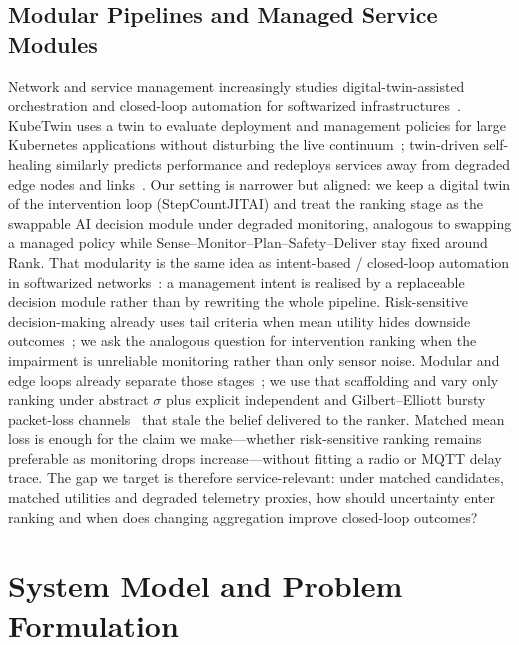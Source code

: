 \documentclass[journal]{IEEEtran}
\begin{document}
\subsection{Modular Pipelines and Managed Service Modules}
Network and service management increasingly studies digital-twin-assisted orchestration and closed-loop automation for softwarized infrastructures~\cite{borsatti2024kubetwin,wang2023dtservice}.
KubeTwin uses a twin to evaluate deployment and management policies for large Kubernetes applications without disturbing the live continuum~\cite{borsatti2024kubetwin}; twin-driven self-healing similarly predicts performance and redeploys services away from degraded edge nodes and links~\cite{wang2023dtservice}.
Our setting is narrower but aligned: we keep a digital twin of the intervention loop (StepCountJITAI) and treat the ranking stage as the swappable AI decision module under degraded monitoring, analogous to swapping a managed policy while Sense--Monitor--Plan--Safety--Deliver stay fixed around Rank.
That modularity is the same idea as intent-based / closed-loop automation in softwarized networks~\cite{clemm2022ibn,boutaba2018mlnet}: a management intent is realised by a replaceable decision module rather than by rewriting the whole pipeline.
Risk-sensitive decision-making already uses tail criteria when mean utility hides downside outcomes~\cite{garcia2015saferl}; we ask the analogous question for intervention ranking when the impairment is unreliable monitoring rather than only sensor noise.
Modular and edge loops already separate those stages~\cite{yao2023react,shi2016edge}; we use that scaffolding and vary only ranking under abstract \(\sigma\) plus explicit independent and Gilbert--Elliott bursty packet-loss channels~\cite{gilbert1960capacity,elliott1963estimates} that stale the belief delivered to the ranker.
Matched mean loss is enough for the claim we make---whether risk-sensitive ranking remains preferable as monitoring drops increase---without fitting a radio or MQTT delay trace.
The gap we target is therefore service-relevant: under matched candidates, matched utilities and degraded telemetry proxies, how should uncertainty enter ranking and when does changing aggregation improve closed-loop outcomes?

\section{System Model and Problem Formulation}
\label{sec:system-model}
\end{document}

